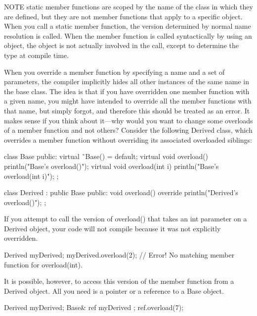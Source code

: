 \begin{myNotic}{NOTE}
static member functions are scoped by the name of the class in which they are defined, but they are not member functions that apply to a specific object. When you call a static member function, the version determined by normal name resolution is called. When the member function is called syntactically by using an object, the object is not actually involved in the call, except to determine the type at compile time.
\end{myNotic}


When you override a member function by specifying a name and a set of parameters, the compiler implicitly hides all other instances of the same name in the base class. The idea is that if you have overridden one member function with a given name, you might have intended to override all the member functions with that name, but simply forgot, and therefore this should be treated as an error. It makes sense if you think about it—why would you want to change some overloads of a member function and not others? Consider the following Derived class, which overrides a member function without overriding its associated overloaded siblings:

\begin{cpp}
class Base
{
    public:
        virtual ˜Base() = default;
        virtual void overload() { println("Base's overload()"); }
        virtual void overload(int i) { println("Base's overload(int i)"); }
};

class Derived : public Base
{
    public:
        void overload() override { println("Derived's overload()"); }
};
\end{cpp}

If you attempt to call the version of overload() that takes an int parameter on a Derived object, your code will not compile because it was not explicitly overridden.

\begin{cpp}
Derived myDerived;
myDerived.overload(2); // Error! No matching member function for overload(int).
\end{cpp}

It is possible, however, to access this version of the member function from a Derived object. All you need is a pointer or a reference to a Base object.

\begin{cpp}
Derived myDerived;
Base& ref { myDerived };
ref.overload(7);
\end{cpp}

